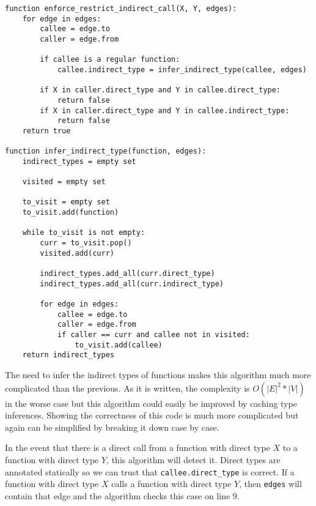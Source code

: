 \noindent\begin{lstlisting}[caption={Pseudocode for an algorithm that could check a $restrict\_indirect\_call$ constraint.  This algorithm returns \lstinline{true} if the call graph respects the constraint and \lstinline{false} if the call graph violates it.},label={lst:rules:rules:restrict_indirect_call}]
function enforce_restrict_indirect_call(X, Y, edges):
    for edge in edges:
        callee = edge.to
        caller = edge.from

        if callee is a regular function:
            callee.indirect_type = infer_indirect_type(callee, edges)

        if X in caller.direct_type and Y in callee.direct_type:
            return false
        if X in caller.direct_type and Y in callee.indirect_type:
            return false
    return true

function infer_indirect_type(function, edges):
    indirect_types = empty set

    visited = empty set

    to_visit = empty set
    to_visit.add(function)

    while to_visit is not empty:
        curr = to_visit.pop()
        visited.add(curr)

        indirect_types.add_all(curr.direct_type)
        indirect_types.add_all(curr.indirect_type)

        for edge in edges:
            callee = edge.to
            caller = edge.from
            if caller == curr and callee not in visited:
                to_visit.add(callee)
    return indirect_types
\end{lstlisting}

The need to infer the indirect types of functions makes this algorithm much more complicated than the previous.  As it is written, the complexity is $O(|E|^2 * |V|)$ in the worse case but this algorithm could easily be improved by caching type inferences.  Showing the correctness of this code is much more complicated but again can be simplified by breaking it down case by case.

In the event that there is a direct call from a function with direct type $X$ to a function with direct type $Y$, this algorithm will detect it.  Direct types are annotated statically so we can trust that \lstinline{callee.direct_type} is correct.  If a function with direct type $X$ calls a function with direct type $Y$, then \lstinline{edges} will contain that edge and the algorithm checks this case on line 9.

